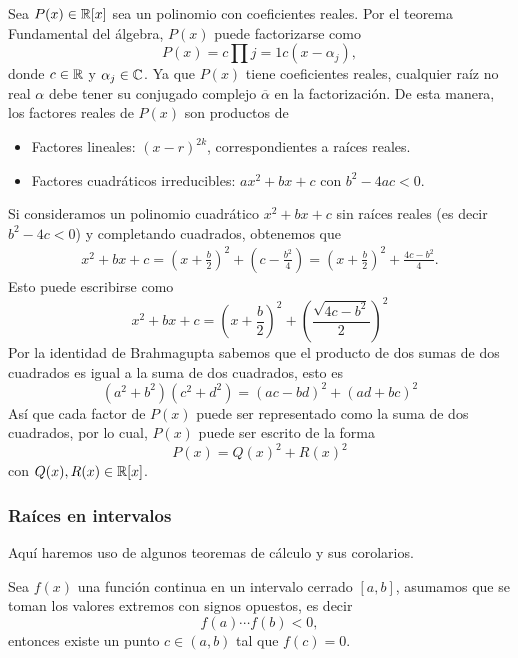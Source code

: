 \begin{solution}
    Sea $P(x) \in \mathbb{R}[x]$ sea un polinomio con coeficientes reales.
    Por el teorema Fundamental del álgebra, $P(x)$ puede factorizarse como
    \[
        P(x) =  c \prod{j = 1}{c} (x - \alpha_j),
    \]
    donde $c \in \mathbb{R}$ y $\alpha_j \in \mathbb{C}$.
    Ya que $P(x)$ tiene coeficientes reales, cualquier raíz no real $\alpha$ debe tener su conjugado complejo $\overline{\alpha}$ en la factorización.
    De esta manera, los factores reales de $P(x)$ son productos de
    \begin{itemize}
        \item Factores lineales: $(x - r)^{2k}$, correspondientes a raíces reales.
        \item Factores cuadráticos irreducibles: $a x^2 + bx + c$ con $b^2 - 4ac < 0$.
    \end{itemize}
    Si consideramos un polinomio cuadrático $x^2 + bx + c$ sin raíces reales (es decir $b^2 - 4c < 0$) y completando cuadrados, obtenemos que
    \begin{align*}
        x^2 + bx + c = \left(x + \frac{b}{2}\right)^2 + \left(c -\frac{b^2}{4}\right) = \left(x + \frac{b}{2}\right)^2 + \frac{4c - b^2}{4}.
    \end{align*}
    Esto puede escribirse como
    \[
        x^2 + bx + c = \left(x + \frac{b}{2}\right)^2 + \left(\frac{\sqrt{4c - b^2}}{2}\right)^2
    \]
    Por la identidad de Brahmagupta sabemos que el producto de dos sumas de dos cuadrados es igual a la suma de dos cuadrados, esto es
    \[
        (a^2 + b^2)(c^2 + d^2) = (ac - bd)^2 + (ad + bc)^2
    \]
    Así que cada factor de $P(x)$ puede ser representado como la suma de dos cuadrados, por lo cual, $P(x)$ puede ser escrito de la forma
    \[
        P(x) = Q(x)^2 + R(x)^2
    \]
    con $Q(x), R(x) \in \mathbb{R}[x]$.
\end{solution}

\subsubsection{Raíces en intervalos}
Aquí haremos uso de algunos teoremas de cálculo y sus corolarios.

\begin{theorem}
    Sea $f(x)$ una función continua en un intervalo cerrado $[a, b]$, asumamos que se toman los valores extremos con signos opuestos, es decir
    \[
        f(a) \cdots f(b) < 0,
    \]
    entonces existe un punto $c \in (a, b)$ tal que $f(c) = 0$.
\end{theorem}



